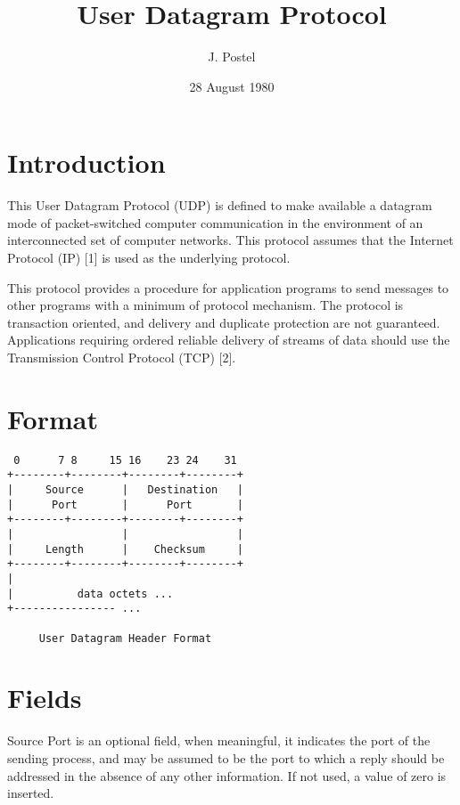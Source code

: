\documentclass[11pt]{article}
\author{J. Postel}
\date{28 August 1980}
\title{User Datagram Protocol}
\begin{document}
\maketitle

\section{Introduction}
\label{sec:orgcbffd31}

This User Datagram  Protocol  (UDP)  is  defined  to  make  available  a
datagram   mode  of  packet-switched   computer   communication  in  the
environment  of  an  interconnected  set  of  computer  networks.   This
protocol  assumes  that the Internet  Protocol  (IP)  [1] is used as the
underlying protocol.

This protocol  provides  a procedure  for application  programs  to send
messages  to other programs  with a minimum  of protocol mechanism.  The
protocol  is transaction oriented, and delivery and duplicate protection
are not guaranteed.  Applications requiring ordered reliable delivery of
streams of data should use the Transmission Control Protocol (TCP) [2].

\section{Format}
\label{sec:org9d04fc8}

\begin{verbatim}
 0      7 8     15 16    23 24    31  
+--------+--------+--------+--------+ 
|     Source      |   Destination   | 
|      Port       |      Port       | 
+--------+--------+--------+--------+ 
|                 |                 | 
|     Length      |    Checksum     | 
+--------+--------+--------+--------+ 
|                                     
|          data octets ...            
+---------------- ...                 

     User Datagram Header Format
\end{verbatim}

\section{Fields}
\label{sec:org681e819}

Source Port is an optional field, when meaningful, it indicates the port
of the sending  process,  and may be assumed  to be the port  to which a
reply should  be addressed  in the absence of any other information.  If
not used, a value of zero is inserted.
\end{document}
